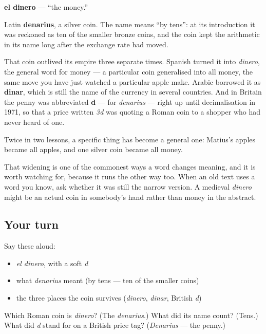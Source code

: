 \begin{cousinweb}
\textbf{el dinero} — \textquotedblleft{}the money.\textquotedblright{}

Latin \textbf{denarius}, a silver coin. The name means \textquotedblleft{}by tens\textquotedblright{}: at its introduction it was reckoned as ten of the smaller bronze coins, and the coin kept the arithmetic in its name long after the exchange rate had moved.

That coin outlived its empire three separate times. Spanish turned it into \emph{dinero}, the general word for money — a particular coin generalised into all money, the same move you have just watched a particular apple make. Arabic borrowed it as \textbf{dinar}, which is still the name of the currency in several countries. And in Britain the penny was abbreviated \textbf{d} — for \emph{denarius} — right up until decimalisation in 1971, so that a price written \emph{3d} was quoting a Roman coin to a shopper who had never heard of one.
\end{cousinweb}

\begin{grammarlens}[title={What you've built}]
Twice in two lessons, a specific thing has become a general one: Matius's apples became all apples, and one silver coin became all money.

That widening is one of the commonest ways a word changes meaning, and it is worth watching for, because it runs the other way too. When an old text uses a word you know, ask whether it was still the narrow version. A medieval \emph{dinero} might be an actual coin in somebody's hand rather than money in the abstract.
\end{grammarlens}

\subsection*{Your turn}
Say these aloud:

\begin{itemize}
\raggedright
  \item \emph{el dinero}, with a soft \emph{d}
  \item what \emph{denarius} meant (by tens — ten of the smaller coins)
  \item the three places the coin survives (\emph{dinero}, \emph{dinar}, British \emph{d})
\end{itemize}

\begin{tcolorbox}[breakable,colback=teal!4,colframe=teal!35!black,title={Before you move on}]
Which Roman coin is \emph{dinero}? (The \emph{denarius}.) What did its name count? (Tens.) What did \emph{d} stand for on a British price tag? (\emph{Denarius} — the penny.)
\end{tcolorbox}
